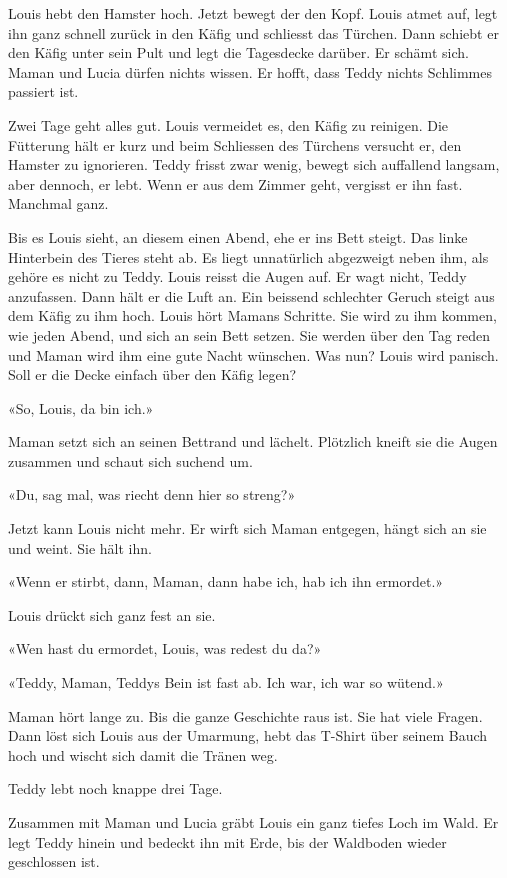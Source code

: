 {Louis hebt den Hamster hoch. Jetzt bewegt der den Kopf. Louis atmet auf,
legt ihn ganz schnell zurück in den Käfig und schliesst das Türchen.
Dann schiebt er den Käfig unter sein Pult und legt die Tagesdecke
darüber. Er schämt sich. Maman und Lucia dürfen nichts wissen. Er hofft,
dass Teddy nichts Schlimmes passiert ist.

\sectionbreak

Zwei Tage geht alles gut. Louis vermeidet es, den Käfig zu reinigen. Die
Fütterung hält er kurz und beim Schliessen des Türchens versucht er, den Hamster zu ignorieren. Teddy frisst zwar wenig, bewegt sich
auffallend langsam, aber dennoch, er lebt. Wenn er aus dem Zimmer geht, vergisst er ihn fast. Manchmal ganz.

Bis es Louis sieht, an diesem einen Abend, ehe er ins Bett steigt. Das
linke Hinterbein des Tieres steht ab. Es liegt unnatürlich abgezweigt
neben ihm, als gehöre es nicht zu Teddy. Louis reisst die Augen auf. Er
wagt nicht, Teddy anzufassen. Dann hält er die Luft an. Ein beissend
schlechter Geruch steigt aus dem Käfig zu ihm hoch. Louis hört Mamans
Schritte. Sie wird zu ihm kommen, wie jeden Abend, und sich an sein Bett
setzen. Sie werden über den Tag reden und Maman wird ihm eine gute Nacht
wünschen. Was nun? Louis wird panisch. Soll er die Decke einfach über
den Käfig legen?

«So, Louis, da bin ich.»

Maman setzt sich an seinen Bettrand und lächelt. Plötzlich kneift sie
die Augen zusammen und schaut sich suchend um.

«Du, sag mal, was riecht denn hier so streng?»

Jetzt kann Louis nicht mehr. Er wirft sich Maman entgegen, hängt sich an
sie und weint. Sie hält ihn.

«Wenn er stirbt, dann, Maman, dann habe ich, hab ich ihn ermordet.»

Louis drückt sich ganz fest an sie.

«Wen hast du ermordet, Louis, was redest du da?»

«Teddy, Maman, Teddys Bein ist fast ab. Ich war, ich war so wütend.»

Maman hört lange zu. Bis die ganze Geschichte raus ist. Sie hat viele Fragen. Dann löst sich Louis aus der Umarmung, hebt das T-Shirt über seinem Bauch hoch und wischt sich damit die Tränen weg.

Teddy lebt noch knappe drei Tage.

\sectionbreak 

Zusammen mit Maman und Lucia gräbt Louis ein ganz tiefes Loch im Wald.
Er legt Teddy hinein und bedeckt ihn mit Erde, bis der Waldboden wieder
geschlossen ist.}
